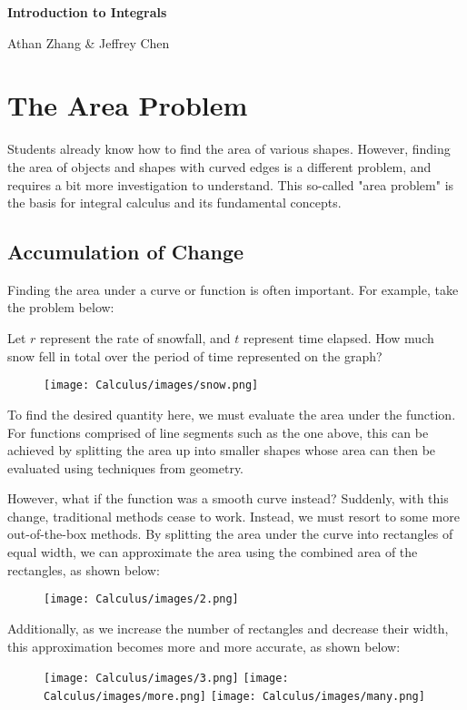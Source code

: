 \documentclass[11pt]{article}
\begin{document}
\textbf{\Huge Introduction to Integrals}

Athan Zhang \& Jeffrey Chen

\section{The Area Problem}
Students already know how to find the area of various shapes. However, finding the area of objects and shapes with curved edges is a different problem, and requires a bit more investigation to understand. This so-called "area problem" is the basis for integral calculus and its fundamental concepts.

\subsection{Accumulation of Change}
Finding the area under a curve or function is often important. For example, take the problem below:

Let $r$ represent the rate of snowfall, and $t$ represent time elapsed. How much snow fell in total over the period of time represented on the graph?

\begin{figure}[h]
    \centering
    \texttt{[image: Calculus/images/snow.png]}
\end{figure}


To find the desired quantity here, we must evaluate the area under the function. For functions comprised of line segments such as the one above, this can be achieved by splitting the area up into smaller shapes whose area can then be evaluated using techniques from geometry. 

However, what if the function was a smooth curve instead? Suddenly, with this change, traditional methods cease to work. Instead, we must resort to some more out-of-the-box methods. By splitting the area under the curve into rectangles of equal width, we can approximate the area using the combined area of the rectangles, as shown below:

\begin{figure}[H]
    \centering
    \texttt{[image: Calculus/images/2.png]}
\end{figure}

Additionally, as we increase the number of rectangles and decrease their width, this approximation becomes more and more accurate, as shown below:

\begin{figure}[H]
    \centering
    \texttt{[image: Calculus/images/3.png]}
    \texttt{[image: Calculus/images/more.png]}
    \texttt{[image: Calculus/images/many.png]}
\end{figure}
\end{document}
